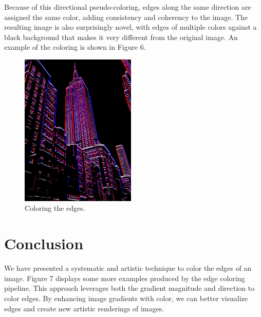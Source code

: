 \documentclass[runningheads]{llncs}
\begin{document}
Because of this directional pseudo-coloring, edges along the same direction are assigned the same color, adding consistency and coherency to the image. The resulting image is also surprisingly novel, with edges of multiple colors against a black background that makes it very different from the original image. An example of the coloring is shown in Figure 6.

\begin{figure}[h!]
\centering
\includegraphics[height=7.3cm]{images/edge_color_1.jpg}
\caption{Coloring the edges.}
\label{fig:example}
\end{figure}

\section{Conclusion}

We have presented a systematic and artistic technique to color the edges of an image. Figure 7 displays some more examples produced by the edge coloring pipeline. This approach leverages both the gradient magnitude and direction to color edges. By enhancing image gradients with color, we can better visualize edges and create new artistic renderings of images.
\end{document}

